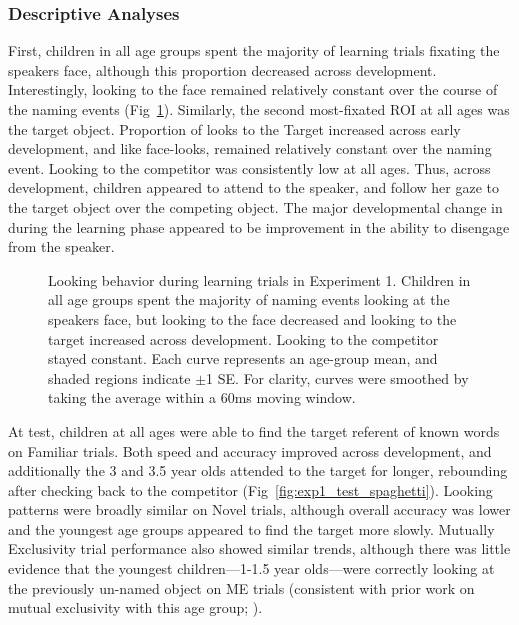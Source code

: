 \documentclass[man,floatsintext]{apa6}
\begin{document}
\subsubsection{Descriptive Analyses}

First, children in all age groups spent the majority of learning trials fixating the speakers face, although this proportion decreased across development. Interestingly, looking to the face remained relatively constant over the course of the naming events (Fig~\ref{fig:exp1_train_spaghetti}). Similarly, the second most-fixated ROI at all ages was the target object. Proportion of looks to the Target increased across early development, and like face-looks, remained relatively constant over the naming event. Looking to the competitor was consistently low at all ages. Thus, across development, children appeared to attend to the speaker, and follow her gaze to the target object over the competing object. The major developmental change in during the learning phase appeared to be improvement in the ability to disengage from the speaker.

\begin{figure}[tb]
	\caption{\label{fig:exp1_train_spaghetti} Looking behavior during learning trials in Experiment 1. Children in all age groups spent the majority of naming events looking at the speakers face, but looking to the face decreased and looking to the target increased across development. Looking to the competitor stayed constant. Each curve represents an age-group mean, and shaded regions indicate $\pm$1 SE. For clarity, curves were smoothed by taking the average within a 60ms moving window.}
\end{figure}

At test, children at all ages were able to find the target referent of known words on Familiar trials. Both speed and accuracy improved across development, and additionally the 3 and 3.5 year olds attended to the target for longer, rebounding after checking back to the competitor (Fig~\ref{fig:exp1_test_spaghetti}). Looking patterns were broadly similar on Novel trials, although overall accuracy was lower and the youngest age groups appeared to find the target more slowly. Mutually Exclusivity trial performance also showed similar trends, although there was little evidence that the youngest children---1-1.5 year olds---were correctly looking at the previously un-named object on ME trials (consistent with prior work on mutual exclusivity with this age group; ).
\end{document}
